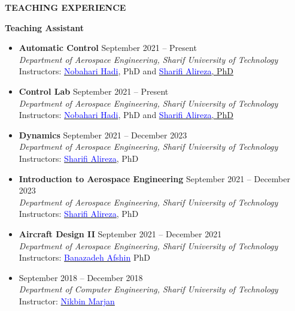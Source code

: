 \documentclass[12pt]{article}
\begin{document}
\begin{center}
	{\noindent \bfseries TEACHING EXPERIENCE}
\end{center}
{\bfseries Teaching Assistant}
\begin{itemize}
	\item {\bfseries Automatic Control}
	 \hfill September 2021 -- Present \\
	\textit{Department of Aerospace Engineering, Sharif University of Technology}\\
	Instructors: \href{https://ae.sharif.edu/~portal/faculty/1091235256}{\textcolor{blue}{Nobahari Hadi}}, PhD and \href{https://ae.sharif.edu/~portal/faculty/1730782165}{\textcolor{blue}{Sharifi Alireza}, PhD}
	\item {\bfseries Control Lab}
	 \hfill September 2021 -- Present \\
	\textit{Department of Aerospace Engineering, Sharif University of Technology}\\
	Instructors: \href{https://ae.sharif.edu/~portal/faculty/1091235256}{\textcolor{blue}{Nobahari Hadi}}, PhD and \href{https://ae.sharif.edu/~portal/faculty/1730782165}{\textcolor{blue}{Sharifi Alireza}, PhD}
	\item {\bfseries Dynamics}
	 \hfill September 2021 -- December 2023 \\
	\textit{Department of Aerospace Engineering, Sharif University of Technology}\\
	Instructors: \href{https://ae.sharif.edu/~portal/faculty/1730782165}{\textcolor{blue}{Sharifi Alireza}}, PhD
	\item {\bfseries Introduction to Aerospace Engineering}
	 \hfill September 2021 -- December 2023 \\
	\textit{Department of Aerospace Engineering, Sharif University of Technology}\\
	Instructors: \href{https://ae.sharif.edu/~portal/faculty/1730782165}{\textcolor{blue}{Sharifi Alireza}}, PhD
	\item {\bfseries Aircraft Design II}
	\hfill September 2021 -- December 2021 \\
   \textit{Department of Aerospace Engineering, Sharif University of Technology}\\
   Instructors: \href{http://ae.sharif.edu/~portal/faculty/1014037799}{\textcolor{blue}{Banazadeh Afshin}} PhD
	\item {}
	\hfill September 2018 -- December 2018 \\
   \textit{Department of Computer Engineering, Sharif University of Technology}\\
   \noindent Instructor: \href{https://www.linkedin.com/in/marjan-nikbin-a27451111}{\textcolor{blue}{Nikbin Marjan}}


\end{itemize}
\end{document}
